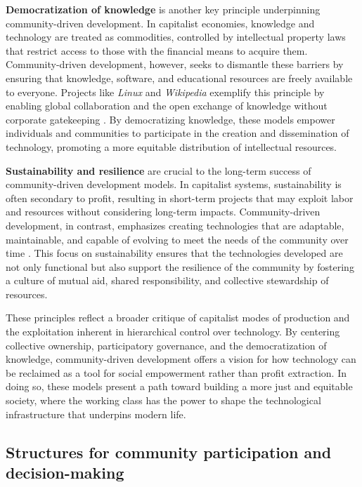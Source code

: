 \begin{refsection}
\textbf{Democratization of knowledge} is another key principle underpinning community-driven development. In capitalist economies, knowledge and technology are treated as commodities, controlled by intellectual property laws that restrict access to those with the financial means to acquire them. Community-driven development, however, seeks to dismantle these barriers by ensuring that knowledge, software, and educational resources are freely available to everyone. Projects like \textit{Linux} and \textit{Wikipedia} exemplify this principle by enabling global collaboration and the open exchange of knowledge without corporate gatekeeping \cite[pp.~91-93]{selwyn2013}. By democratizing knowledge, these models empower individuals and communities to participate in the creation and dissemination of technology, promoting a more equitable distribution of intellectual resources.

\textbf{Sustainability and resilience} are crucial to the long-term success of community-driven development models. In capitalist systems, sustainability is often secondary to profit, resulting in short-term projects that may exploit labor and resources without considering long-term impacts. Community-driven development, in contrast, emphasizes creating technologies that are adaptable, maintainable, and capable of evolving to meet the needs of the community over time \cite[pp.~170-173]{foster2000}. This focus on sustainability ensures that the technologies developed are not only functional but also support the resilience of the community by fostering a culture of mutual aid, shared responsibility, and collective stewardship of resources. 

These principles reflect a broader critique of capitalist modes of production and the exploitation inherent in hierarchical control over technology. By centering collective ownership, participatory governance, and the democratization of knowledge, community-driven development offers a vision for how technology can be reclaimed as a tool for social empowerment rather than profit extraction. In doing so, these models present a path toward building a more just and equitable society, where the working class has the power to shape the technological infrastructure that underpins modern life.

\subsection{Structures for community participation and decision-making}


\end{refsection}
